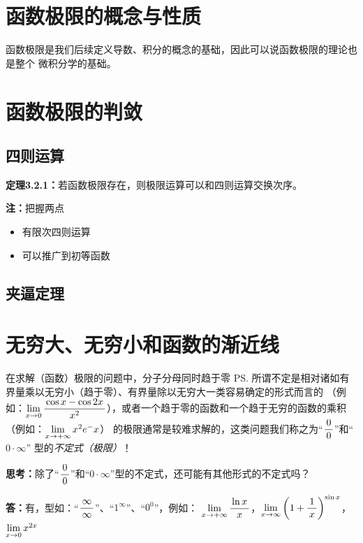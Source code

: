 \section{函数极限的概念与性质}

函数极限是我们后续定义导数、积分的概念的基础，因此可以说函数极限的理论也是整个
微积分学的基础。



\section{函数极限的判敛}

\subsection{四则运算}

{\bf 定理3.2.1：}若函数极限存在，则极限运算可以和四则运算交换次序。

{\bf 注：}把握两点
\begin{itemize}
  \setlength{\itemindent}{1cm}
  \item 有限次四则运算
  \item 可以推广到初等函数
\end{itemize}







\subsection{夹逼定理}


\section{无穷大、无穷小和函数的渐近线}

在求解（函数）极限的问题中，分子分母同时趋于零
\ps{所谓不定是相对诸如有界量乘以无穷小（趋于零）、有界量除以无穷大一类容易确定的形式而言的}
（例如：$\lim\limits_{x\to{0}}\displaystyle\frac{\,{\cos
x-\cos2x}\,}{\,{x^2}\,}$），或者一个趋于零的函数和一个趋于无穷的函数的乘积（例如：$\lim\limits_{x\to{+\infty}}x^2e^-x$）
的极限通常是较难求解的，这类问题我们称之为“$\displaystyle\frac{\,{0}\,}{\,{0}\,}$”和“$0\cdot\infty$” 型的{\it 不定式（极限）}！


{\bf 思考：}除了“$\displaystyle\frac{\,{0}\,}{\,{0}\,}$”和“$0\cdot\infty$”型的不定式，还可能有其他形式的不定式吗？

{\bf 答：}有，型如：“$\displaystyle\frac{\,{\infty}\,}{\,{\infty}\,}$”、“$1^{\infty}$”、“$0^0$”，例如：
$\lim\limits_{x\to{+\infty}}\displaystyle\frac{\,{\ln x}\,}{\,{x}\,}$，$\lim\limits_{x\to{\infty}}\left(1+\displaystyle\frac{\,{1}\,}{\,{x}\,}\right)^{\sin
x}$，$\lim\limits_{x\to{0}}x^{2x}$

